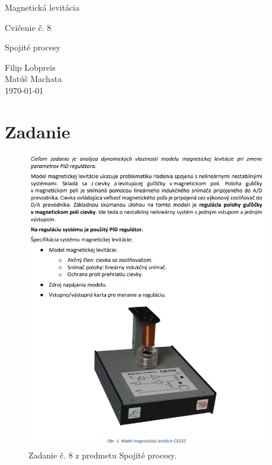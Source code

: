 \documentclass{article}
\begin{document}
\begin{titlepage}
	\null\vfill

	\begin{center}
		{\Huge Magnetická levitácia }
		\vskip 2cm

		{\Large Cvičenie č. 8}
		\vskip 0.5cm

		{\large Spojité procesy}
	\end{center}

	\vfill
	\vfill

	\begin{flushright}
		Filip Lobpreis \\
		Matúš Machata \\
		\small\today\\
	\end{flushright}
	\hfill
\end{titlepage}

\thispagestyle{empty}
\clearpage

\tableofcontents
\thispagestyle{empty}
\clearpage

\section{Zadanie}
\label{sec:zadanie}

\begin{figure}[!htbp]
	\begin{center}
		\includegraphics[width=0.95\textwidth]{include/zadanie.png}
	\end{center}
	\caption{Zadanie č. 8 z predmetu Spojité procesy.}
	\label{fig:zadanie}
\end{figure}
\end{document}
